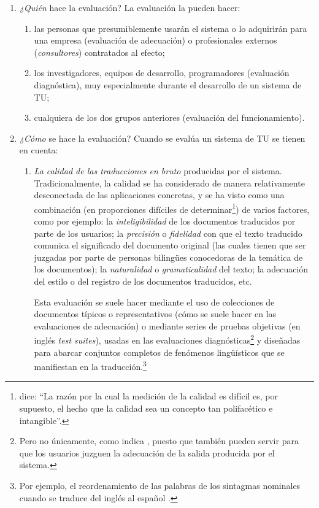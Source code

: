 \begin{enumerate}
\item \emph{¿Quién} hace la evaluación? La evaluación la pueden hacer: \begin{enumerate} \item las personas que presumiblemente usarán el sistema o lo adquirirán para una empresa (evaluación de adecuación) o profesionales externos (\emph{consultores}) contratados al efecto; \item los investigadores, equipos de desarrollo, programadores (evaluación diagnóstica), muy especialmente durante el desarrollo de un sistema de TU; \item cualquiera de los dos grupos anteriores (evaluación del funcionamiento). \end{enumerate} \item \emph{¿Cómo} se hace la evaluación? Cuando se evalúa un sistema de TU se tienen en cuenta: \begin{enumerate} \item \emph{La calidad de las traducciones en bruto} producidas por el sistema. Tradicionalmente, la calidad se ha considerado de manera relativamente desconectada de las aplicaciones concretas, y se ha visto como una combinación (en proporciones difíciles de determinar\footnote{\citet{minnis94j} dice: ``La razón por la cual la medición de la calidad es difícil es, por supuesto, el hecho que la calidad sea un concepto tan polifacético e intangible''.}) de varios factores, como por ejemplo: la \emph{inteligibilidad} de los documentos traducidos por parte de los usuarios; la \emph{precisión} o \emph{fidelidad} con que el texto traducido comunica el significado del documento original (las cuales tienen que ser juzgadas por parte de personas bilingües conocedoras de la temática de los documentos); la \emph{naturalidad} o \emph{gramaticalidad} del texto; la adecuación del estilo o del registro de los documentos traducidos, etc. 

Esta evaluación se suele hacer mediante el uso de colecciones de documentos típicos o representativos (cómo se suele hacer en las evaluaciones de adecuación) o mediante series de pruebas objetivas (en inglés \emph{test suites}), usadas en las evaluaciones diagnósticas\footnote{Pero no únicamente, como indica \citet{lewis97j}, puesto que también pueden servir para que los usuarios juzguen la adecuación de la salida producida por el sistema.} y diseñadas para abarcar conjuntos completos de fenómenos lingüísticos que se manifiestan en la traducción.\footnote{Por ejemplo, el reordenamiento de las palabras de los sintagmas nominales cuando se traduce del inglés al español \citep{mira98j,forcada00}.} 


\end{enumerate}
\end{enumerate}

